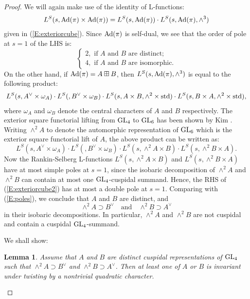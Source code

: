 \documentclass[11pt]{amsart}
\theoremstyle{plain}
\newtheorem{lemma}[equation]{Lemma}
\numberwithin{equation}{section}
\def\GL{{\rm GL}}
\begin{document}
\begin{proof}
 We will  again make use of the identity of L-functions:
 \begin{equation}  \label{E:exteriorcube2} 
  L^S(s, {\rm Ad}(\pi)  \times {\rm Ad} (\pi)) = L^S(s, {\rm Ad}(\pi)) \cdot L^S(s, {\rm Ad}(\pi), \wedge^3) \end{equation}
  given in (\ref{E:exteriorcube}). Since ${\rm Ad}(\pi)$ is self-dual, we see that the order of pole at $s=1$ of the LHS is:
  \begin{equation} \label{E:poles}
  \begin{cases} 
  2, \text{ if $A$ and $B$ are distinct;} \\
  4, \text{ if $A$ and $B$ are isomorphic.} \end{cases} \end{equation}
  On the other hand, if ${\rm Ad}(\pi) = A \boxplus B$, then $L^S(s, {\rm Ad}(\pi), \wedge^3)$ is equal to the following product:
  \[  L^S(s, A^{\vee} \times \omega_A) \cdot L^S(, B^{\vee} \times \omega_B) \cdot L^S(s, A \times B, \wedge^2 \times {\rm std})  \cdot L^S(s, B \times A, \wedge^2 \times {\rm std}), \] 
   where $\omega_A$ and $\omega_B$ denote the central characters of $A$ and $B$ respectively.  The exterior square functorial lifting from $\GL_4$ to $\GL_6$ has been shown by Kim \cite{Ki}.  Writing $\wedge^2A$ to denote the automorphic representation of $\GL_6$ which is the exterior square functorial lift of $A$, the above product can be written as:
    \[  L^S(s, A^{\vee} \times \omega_A) \cdot L^S(, B^{\vee} \times \omega_B) \cdot L^S(s, \wedge^2 A \times B)  \cdot L^S(s, \wedge^2B \times A). \]
Now the Rankin-Selberg L-functions $L^S(s, \wedge^2 A \times B)$ and $L^S(s, \wedge^2B \times A)$ have at most simple poles at $s=1$, since the isobaric decomposition of $\wedge^2A$ and $\wedge^2B$ can contain at most one $\GL_4$-cuspidal summand. 
Hence, the RHS of (\ref{E:exteriorcube2}) has at most a double pole at $s=1$. Comparing with (\ref{E:poles}), we conclude that $A$ and $B$ are distinct, and 
\[   \wedge^2 A \supset B^{\vee} \quad \text{and} \quad \wedge^2B \supset A^{\vee} \]
in their isobaric decompositions. In particular, $\wedge^2 A$ and $\wedge^2 B$ are not cuspidal and contain a cuspidal $\GL_4$-summand.
\vskip 5pt

We shall show:
\vskip 5pt

\begin{lemma}
Assume that $A$ and $B$ are distinct cuspidal representations of $\GL_4$ such that $\wedge^2 A \supset B^{\vee}$ and $\wedge^2 B \supset A^{\vee}$. Then at least one of $A$ or $B$ is invariant under twisting by a nontrivial quadratic character.
\end{lemma}


\end{proof}
\end{document}
